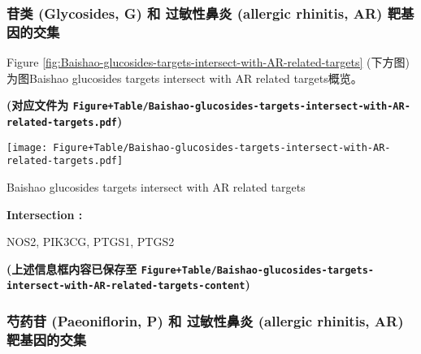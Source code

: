 \documentclass[
]{article}
\begin{document}
\hypertarget{ux82f7ux7c7b-glycosides-g-ux548c-ux8fc7ux654fux6027ux9f3bux708e-allergic-rhinitis-ar-ux9776ux57faux56e0ux7684ux4ea4ux96c6}{%
\subsubsection{苷类 (Glycosides, G) 和 过敏性鼻炎 (allergic rhinitis, AR) 靶基因的交集}\label{ux82f7ux7c7b-glycosides-g-ux548c-ux8fc7ux654fux6027ux9f3bux708e-allergic-rhinitis-ar-ux9776ux57faux56e0ux7684ux4ea4ux96c6}}

Figure \ref{fig:Baishao-glucosides-targets-intersect-with-AR-related-targets} (下方图) 为图Baishao glucosides targets intersect with AR related targets概览。

\textbf{(对应文件为 \texttt{Figure+Table/Baishao-glucosides-targets-intersect-with-AR-related-targets.pdf})}

\def\@captype{figure}
\begin{center}
\texttt{[image: Figure+Table/Baishao-glucosides-targets-intersect-with-AR-related-targets.pdf]}
\caption{Baishao glucosides targets intersect with AR related targets}\label{fig:Baishao-glucosides-targets-intersect-with-AR-related-targets}
\end{center}
\begin{center}\begin{tcolorbox}[colback=gray!10, colframe=gray!50, width=0.9\linewidth, arc=1mm, boxrule=0.5pt]
\textbf{
Intersection
:}

\vspace{0.5em}

    NOS2, PIK3CG, PTGS1, PTGS2

\vspace{2em}
\end{tcolorbox}
\end{center}

\textbf{(上述信息框内容已保存至 \texttt{Figure+Table/Baishao-glucosides-targets-intersect-with-AR-related-targets-content})}

\hypertarget{ux828dux836fux82f7-paeoniflorin-p-ux548c-ux8fc7ux654fux6027ux9f3bux708e-allergic-rhinitis-ar-ux9776ux57faux56e0ux7684ux4ea4ux96c6}{%
\subsubsection{芍药苷 (Paeoniflorin, P) 和 过敏性鼻炎 (allergic rhinitis, AR) 靶基因的交集}\label{ux828dux836fux82f7-paeoniflorin-p-ux548c-ux8fc7ux654fux6027ux9f3bux708e-allergic-rhinitis-ar-ux9776ux57faux56e0ux7684ux4ea4ux96c6}}
\end{document}
